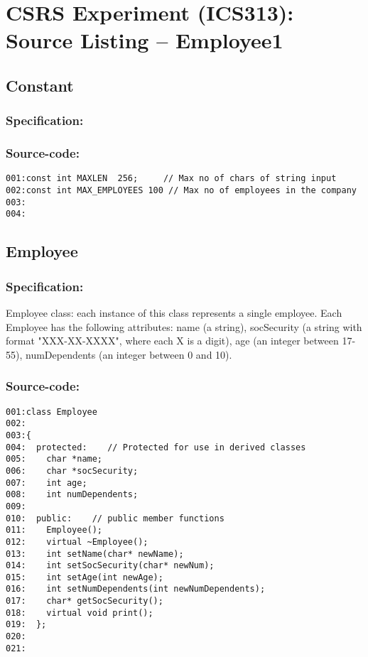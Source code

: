 
\chapter {CSRS Experiment (ICS313): Source Listing -- Employee1}
\small
	  

\section{Constant}
\subsection*{Specification:}

\subsection*{Source-code:}
\begin{verbatim}
001:const int MAXLEN  256;     // Max no of chars of string input
002:const int MAX_EMPLOYEES 100 // Max no of employees in the company  
003:
004:
\end{verbatim}
\section{Employee}
\subsection*{Specification:}
Employee class: each instance of this class represents a single employee. Each Employee
has the following attributes: name (a string), socSecurity (a string with format
"XXX-XX-XXXX", where each X is a digit), age (an integer between 17-55), numDependents
(an integer between 0 and 10).
\subsection*{Source-code:}
\begin{verbatim}
001:class Employee
002:
003:{
004:  protected:    // Protected for use in derived classes
005:    char *name;
006:    char *socSecurity;
007:    int age;
008:    int numDependents;
009:
010:  public:    // public member functions
011:    Employee();
012:    virtual ~Employee();
013:    int setName(char* newName);
014:    int setSocSecurity(char* newNum);
015:    int setAge(int newAge);
016:    int setNumDependents(int newNumDependents);
017:    char* getSocSecurity();
018:    virtual void print();
019:  };
020:
021:
\end{verbatim}
